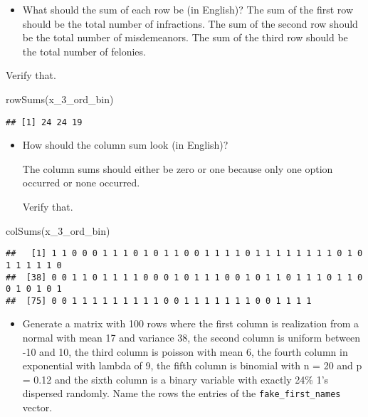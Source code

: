 \documentclass[
]{article}
\newenvironment{Shaded}{\begin{snugshade}}{\end{snugshade}}
\newcommand{\FunctionTok}[1]{\textcolor[rgb]{0.00,0.00,0.00}{#1}}
\newcommand{\NormalTok}[1]{#1}
\providecommand{\tightlist}{%
  \setlength{\itemsep}{0pt}\setlength{\parskip}{0pt}}
\begin{document}
\begin{itemize}
\tightlist
\item
  What should the sum of each row be (in English)? The sum of the first
  row should be the total number of infractions. The sum of the second
  row should be the total number of misdemeanors. The sum of the third
  row should be the total number of felonies.
\end{itemize}

Verify that.

\begin{Shaded}
\begin{Highlighting}[]
\FunctionTok{rowSums}\NormalTok{(x\_3\_ord\_bin)}
\end{Highlighting}
\end{Shaded}

\begin{verbatim}
## [1] 24 24 19
\end{verbatim}

\begin{itemize}
\item
  How should the column sum look (in English)?

  The column sums should either be zero or one because only one option
  occurred or none occurred.

  Verify that.
\end{itemize}

\begin{Shaded}
\begin{Highlighting}[]
\FunctionTok{colSums}\NormalTok{(x\_3\_ord\_bin)}
\end{Highlighting}
\end{Shaded}

\begin{verbatim}
##   [1] 1 1 0 0 0 1 1 1 0 1 0 1 1 0 0 1 1 1 1 0 1 1 1 1 1 1 1 1 0 1 0 1 1 1 1 1 0
##  [38] 0 0 1 1 0 1 1 1 1 0 0 0 1 0 1 1 1 0 0 1 0 1 1 0 1 1 1 0 1 1 0 0 1 0 1 0 1
##  [75] 0 0 1 1 1 1 1 1 1 1 1 0 0 1 1 1 1 1 1 1 0 0 1 1 1 1
\end{verbatim}

\begin{itemize}
\tightlist
\item
  Generate a matrix with 100 rows where the first column is realization
  from a normal with mean 17 and variance 38, the second column is
  uniform between -10 and 10, the third column is poisson with mean 6,
  the fourth column in exponential with lambda of 9, the fifth column is
  binomial with n = 20 and p = 0.12 and the sixth column is a binary
  variable with exactly 24\% 1's dispersed randomly. Name the rows the
  entries of the \texttt{fake\_first\_names} vector.
\end{itemize}
\end{document}
